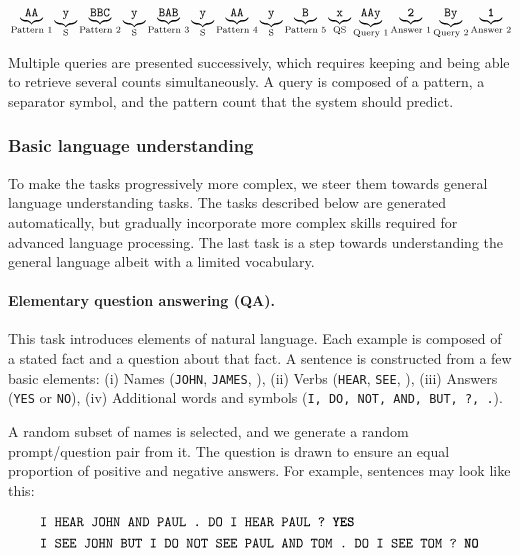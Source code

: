 \begin{align*}
  &\underbrace{\texttt{AA}}_{\text{Pattern 1}}\underbrace{\texttt{y}}_{\text{S}}
    \underbrace{\texttt{BBC}}_{\text{Pattern 2}}\underbrace{\texttt{y}}_{\text{S}}\underbrace{\texttt{BAB}}_{\text{Pattern 3}}\underbrace{\texttt{y}}_{\text{S}}\underbrace{\texttt{AA}}_{\text{Pattern 4}}\underbrace{\texttt{y}}_{\text{S}}\underbrace{\texttt{B}}_{\text{Pattern 5}}
    \underbrace{\texttt{x}}_{\text{QS}}\underbrace{\texttt{AAy}}_{\text{Query 1}}\underbrace{\texttt{\textbf{2}}}_{\text{Answer 1}}
    \underbrace{\texttt{By}}_{\text{Query 2}}\underbrace{\texttt{\textbf{1}}}_{\text{Answer 2}} \\
\end{align*}

Multiple queries are presented successively, which requires keeping and being
able to retrieve several counts simultaneously. A query is composed of a
pattern, a separator symbol, and the pattern count that the system should
predict.

\subsubsection{Basic language understanding}
To make the tasks progressively more complex, we steer them towards general
language understanding tasks. The tasks described below are generated automatically, but gradually incorporate more complex skills
required for advanced language processing.
The last task is a step towards understanding the general language albeit with a limited vocabulary.

\paragraph{Elementary question answering (QA).}
This task introduces elements of natural language. Each example is composed of a
stated fact and a question about that fact. A sentence is constructed from a few
basic elements:
(i) Names (\eg\texttt{JOHN}, \texttt{JAMES}, \etc),
(ii) Verbs (\eg\texttt{HEAR}, \texttt{SEE}, \etc),
(iii) Answers (\texttt{YES} or \texttt{NO}),
(iv) Additional words and symbols (\texttt{I, DO, NOT, AND, BUT, ?, .}).

A random subset of names is selected, and we generate a random prompt/question
pair from it.
The question is drawn to ensure an equal proportion of
positive and negative answers. For example, sentences may look like this:

\begin{align*}
&  \texttt{I HEAR JOHN AND PAUL .}\texttt{ DO I HEAR PAUL ?} \texttt{\textbf{ YES}}\\
&    \texttt{I SEE JOHN BUT I DO NOT SEE PAUL AND TOM . DO I SEE TOM ? \textbf{NO}}
\end{align*}

